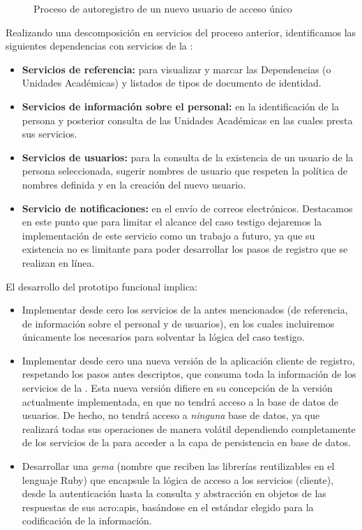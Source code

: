 \begin{figure}[H]
  \caption{Proceso de autoregistro de un nuevo usuario de acceso único}
  \label{fig:diagrama-flujo-registro}
\end{figure}

Realizando una descomposición en servicios del proceso anterior, identificamos las siguientes dependencias con servicios de la {\cloud}:

\begin{itemize}
  \item \textbf{Servicios de referencia:} para visualizar y marcar las Dependencias (o Unidades Académicas) y listados de tipos de documento de identidad.

  \item \textbf{Servicios de información sobre el personal:} en la identificación de la persona y posterior consulta de las Unidades Académicas en las cuales presta sus servicios.

  \item \textbf{Servicios de usuarios:} para la consulta de la existencia de un usuario de la persona seleccionada, sugerir nombres de usuario que respeten la política de nombres definida y en la creación del nuevo usuario.

  \item \textbf{Servicio de notificaciones:} en el envío de correos electrónicos. Destacamos en este punto que para limitar el alcance del caso testigo dejaremos la implementación de este servicio como un trabajo a futuro, ya que su existencia no es limitante para poder desarrollar los pasos de registro que se realizan en línea.
\end{itemize}

El desarrollo del prototipo funcional implica:

\begin{itemize}
  \item Implementar desde cero los servicios de la {\cloud} antes mencionados (de referencia, de información sobre el personal y de usuarios), en los cuales incluiremos únicamente los  necesarios para solventar la lógica del caso testigo.

  \item Implementar desde cero una nueva versión de la aplicación cliente de registro, respetando los pasos antes descriptos, que consuma toda la información de los servicios de la {\cloud}. Esta nueva versión difiere en su concepción de la versión actualmente implementada, en que no tendrá acceso a la base de datos de usuarios. De hecho, no tendrá acceso a \textit{ninguna} base de datos, ya que realizará todas sus operaciones de manera volátil dependiendo completamente de los servicios de la {\cloud} para acceder a la capa de persistencia en base de datos.

  \item Desarrollar una \textit{gema} (nombre que reciben las librerías reutilizables en el lenguaje Ruby) que encapsule la lógica de acceso a los servicios (cliente), desde la autenticación hasta la consulta y abstracción en objetos de las respuestas de sus \glspl{acro:api}, basándose en el estándar elegido para la codificación de la información.
\end{itemize}

